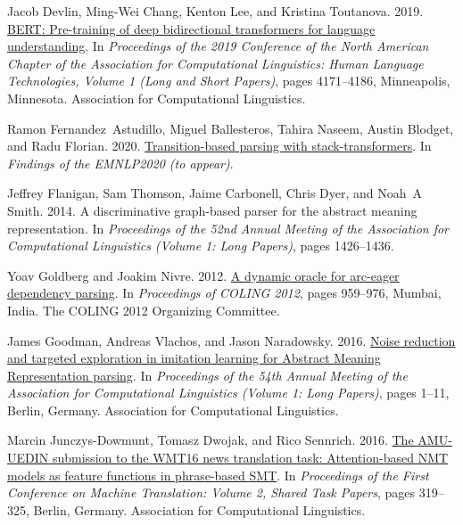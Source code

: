 \documentclass[11pt,a4paper]{article}
\begin{document}
\begin{thebibliography}{27}
Jacob Devlin, Ming-Wei Chang, Kenton Lee, and Kristina Toutanova. 2019.
\newblock \href {https://doi.org/10.18653/v1/N19-1423} {{BERT}: Pre-training of
  deep bidirectional transformers for language understanding}.
\newblock In \emph{Proceedings of the 2019 Conference of the North {A}merican
  Chapter of the Association for Computational Linguistics: Human Language
  Technologies, Volume 1 (Long and Short Papers)}, pages 4171--4186,
  Minneapolis, Minnesota. Association for Computational Linguistics.

Ramon Fernandez~Astudillo, Miguel Ballesteros, Tahira Naseem, Austin Blodget,
  and Radu Florian. 2020.
\newblock \href {https://openreview.net/forum?id=b36spsuUAde} {Transition-based
  parsing with stack-transformers}.
\newblock In \emph{Findings of the EMNLP2020 (to appear)}.

Jeffrey Flanigan, Sam Thomson, Jaime Carbonell, Chris Dyer, and Noah~A Smith.
  2014.
\newblock A discriminative graph-based parser for the abstract meaning
  representation.
\newblock In \emph{Proceedings of the 52nd Annual Meeting of the Association
  for Computational Linguistics (Volume 1: Long Papers)}, pages 1426--1436.

Yoav Goldberg and Joakim Nivre. 2012.
\newblock \href {https://www.aclweb.org/anthology/C12-1059} {A dynamic oracle
  for arc-eager dependency parsing}.
\newblock In \emph{Proceedings of {COLING} 2012}, pages 959--976, Mumbai,
  India. The COLING 2012 Organizing Committee.

James Goodman, Andreas Vlachos, and Jason Naradowsky. 2016.
\newblock \href {https://doi.org/10.18653/v1/P16-1001} {Noise reduction and
  targeted exploration in imitation learning for {A}bstract {M}eaning
  {R}epresentation parsing}.
\newblock In \emph{Proceedings of the 54th Annual Meeting of the Association
  for Computational Linguistics (Volume 1: Long Papers)}, pages 1--11, Berlin,
  Germany. Association for Computational Linguistics.

Marcin Junczys-Dowmunt, Tomasz Dwojak, and Rico Sennrich. 2016.
\newblock \href {https://doi.org/10.18653/v1/W16-2316} {The {AMU}-{UEDIN}
  submission to the {WMT}16 news translation task: Attention-based {NMT} models
  as feature functions in phrase-based {SMT}}.
\newblock In \emph{Proceedings of the First Conference on Machine Translation:
  Volume 2, Shared Task Papers}, pages 319--325, Berlin, Germany. Association
  for Computational Linguistics.


\end{thebibliography}
\end{document}
